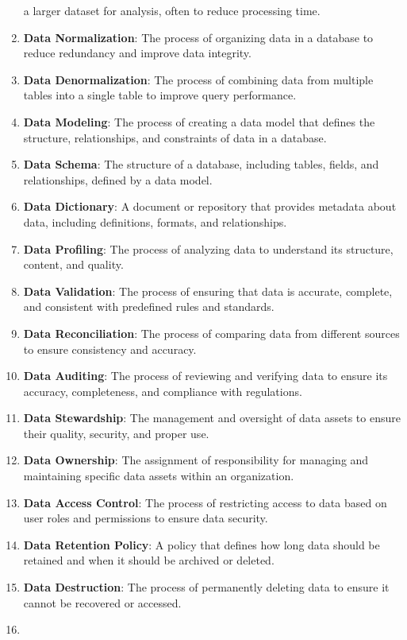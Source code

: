 \documentclass[
  letterpaper,
  DIV=11,
  numbers=noendperiod]{scrartcl}
\begin{document}
\begin{enumerate}
  a larger dataset for analysis, often to reduce processing time.
\item
  \textbf{Data Normalization}: The process of organizing data in a
  database to reduce redundancy and improve data integrity.
\item
  \textbf{Data Denormalization}: The process of combining data from
  multiple tables into a single table to improve query performance.
\item
  \textbf{Data Modeling}: The process of creating a data model that
  defines the structure, relationships, and constraints of data in a
  database.
\item
  \textbf{Data Schema}: The structure of a database, including tables,
  fields, and relationships, defined by a data model.
\item
  \textbf{Data Dictionary}: A document or repository that provides
  metadata about data, including definitions, formats, and
  relationships.
\item
  \textbf{Data Profiling}: The process of analyzing data to understand
  its structure, content, and quality.
\item
  \textbf{Data Validation}: The process of ensuring that data is
  accurate, complete, and consistent with predefined rules and
  standards.
\item
  \textbf{Data Reconciliation}: The process of comparing data from
  different sources to ensure consistency and accuracy.
\item
  \textbf{Data Auditing}: The process of reviewing and verifying data to
  ensure its accuracy, completeness, and compliance with regulations.
\item
  \textbf{Data Stewardship}: The management and oversight of data assets
  to ensure their quality, security, and proper use.
\item
  \textbf{Data Ownership}: The assignment of responsibility for managing
  and maintaining specific data assets within an organization.
\item
  \textbf{Data Access Control}: The process of restricting access to
  data based on user roles and permissions to ensure data security.
\item
  \textbf{Data Retention Policy}: A policy that defines how long data
  should be retained and when it should be archived or deleted.
\item
  \textbf{Data Destruction}: The process of permanently deleting data to
  ensure it cannot be recovered or accessed.
\item

\end{enumerate}
\end{document}
